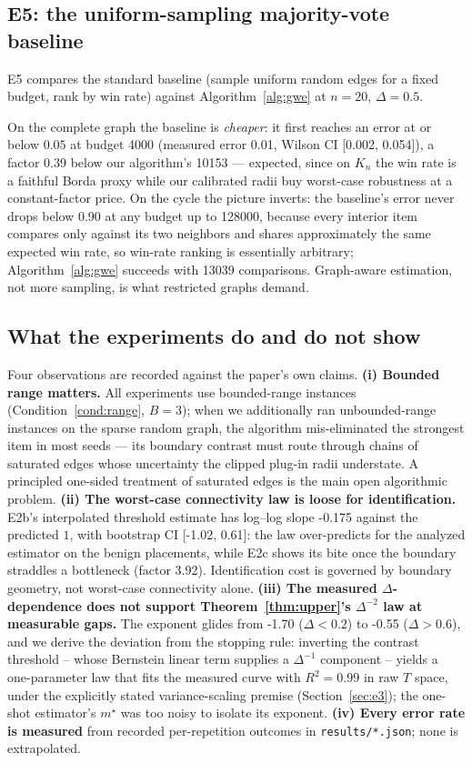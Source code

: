 \documentclass[11pt]{article}
\theoremstyle{definition}
\begin{document}
\subsection{E5: the uniform-sampling majority-vote baseline}

E5 compares the standard baseline (sample uniform random edges for a fixed budget, rank by win rate) against Algorithm~\ref{alg:gwe} at $n=20$, $\Delta=0.5$.

On the complete graph the baseline is \emph{cheaper}: it first reaches an error at or below $0.05$ at budget 4000 (measured error 0.01, Wilson CI [0.002, 0.054]), a factor 0.39 below our algorithm's 10153 --- expected, since on $K_n$ the win rate is a faithful Borda proxy while our calibrated radii buy worst-case robustness at a constant-factor price.  On the cycle the picture inverts: the baseline's error never drops below 0.90 at any budget up to 128000, because every interior item compares only against its two neighbors and shares approximately the same expected win rate, so win-rate ranking is essentially arbitrary; Algorithm~\ref{alg:gwe} succeeds with 13039 comparisons.  Graph-aware estimation, not more sampling, is what restricted graphs demand.

\subsection{What the experiments do and do not show}
\label{sec:exp-discussion}
Four observations are recorded against the paper's own claims.  \textbf{(i) Bounded range matters.}  All experiments use bounded-range instances (Condition~\ref{cond:range}, $B=3$); when we additionally ran unbounded-range instances on the sparse random graph, the algorithm mis-eliminated the strongest item in most seeds --- its boundary contrast must route through chains of saturated edges whose uncertainty the clipped plug-in radii understate.  A principled one-sided treatment of saturated edges is the main open algorithmic problem.  \textbf{(ii) The worst-case connectivity law is loose for identification.}  E2b's interpolated threshold estimate has log--log slope -0.175 against the predicted $1$, with bootstrap CI [-1.02, 0.61]: the law over-predicts for the analyzed estimator on the benign placements, while E2c shows its bite once the boundary straddles a bottleneck (factor 3.92).  Identification cost is governed by boundary geometry, not worst-case connectivity alone.  \textbf{(iii) The measured $\Delta$-dependence does not support Theorem~\ref{thm:upper}'s $\Delta^{-2}$ law at measurable gaps.}  The exponent glides from -1.70 ($\Delta<0.2$) to -0.55 ($\Delta>0.6$), and we derive the deviation from the stopping rule: inverting the contrast threshold -- whose Bernstein linear term supplies a $\Delta^{-1}$ component -- yields a one-parameter law that fits the measured curve with $R^2=0.99$ in raw $T$ space, under the explicitly stated variance-scaling premise (Section~\ref{sec:e3}); the one-shot estimator's $m^\star$ was too noisy to isolate its exponent.  \textbf{(iv) Every error rate is measured} from recorded per-repetition outcomes in \texttt{results/*.json}; none is extrapolated.
\end{document}
